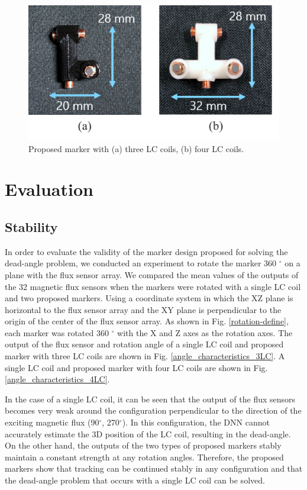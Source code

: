 \documentclass[journal,twoside,web]{ieeecolor}
\begin{document}
\begin{figure}[!t]
    \centerline{\includegraphics[width=\columnwidth]{figure/marker_size.png}}
    \caption{Proposed marker with (a) three LC coils, (b) four LC coils.}
    \label{marker_size}
\end{figure}

\section{Evaluation}
\subsection{Stability}
In order to evaluate the validity of the marker design proposed for solving the dead-angle problem, we conducted an experiment to rotate the marker 360 $^\circ$ on a plane with the flux sensor array. We compared the mean values of the outputs of the 32 magnetic flux sensors when the markers were rotated with a single LC coil and two proposed markers. Using a coordinate system in which the XZ plane is horizontal to the flux sensor array and the XY plane is perpendicular to the origin of the center of the flux sensor array. As shown in Fig. \ref{rotation-define}, each marker was rotated 360 $^\circ$ with the X and Z axes as the rotation axes. The output of the flux sensor and rotation angle of a single LC coil and proposed marker with three LC coils are shown in Fig. \ref{angle_characteristics_3LC}. A single LC coil and proposed marker with four LC coils are shown in Fig. \ref{angle_characteristics_4LC}.

In the case of a single LC coil, it can be seen that the output of the flux sensors becomes very weak around the configuration perpendicular to the direction of the exciting magnetic flux (90$^\circ$, 270$^\circ$). In this configuration, the DNN cannot accurately estimate the 3D position of the LC coil, resulting in the dead-angle. On the other hand, the outputs of the two types of proposed markers stably maintain a constant strength at any rotation angles. Therefore, the proposed markers show that tracking can be continued stably in any configuration and that the dead-angle problem that occurs with a single LC coil can be solved.
\end{document}
